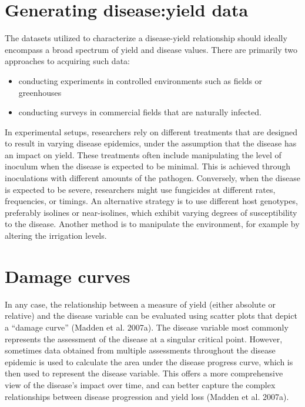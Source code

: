 \documentclass[
  letterpaper,
]{book}
\begin{document}
\hypertarget{generating-diseaseyield-data}{%
\section{Generating disease:yield
data}\label{generating-diseaseyield-data}}

The datasets utilized to characterize a disease-yield relationship
should ideally encompass a broad spectrum of yield and disease values.
There are primarily two approaches to acquiring such data:

\begin{itemize}
\item
  conducting experiments in controlled environments such as fields or
  greenhouses
\item
  conducting surveys in commercial fields that are naturally infected.
\end{itemize}

In experimental setups, researchers rely on different treatments that
are designed to result in varying disease epidemics, under the
assumption that the disease has an impact on yield. These treatments
often include manipulating the level of inoculum when the disease is
expected to be minimal. This is achieved through inoculations with
different amounts of the pathogen. Conversely, when the disease is
expected to be severe, researchers might use fungicides at different
rates, frequencies, or timings. An alternative strategy is to use
different host genotypes, preferably isolines or near-isolines, which
exhibit varying degrees of susceptibility to the disease. Another method
is to manipulate the environment, for example by altering the irrigation
levels.

\hypertarget{damage-curves}{%
\section{Damage curves}\label{damage-curves}}

In any case, the relationship between a measure of yield (either
absolute or relative) and the disease variable can be evaluated using
scatter plots that depict a ``damage curve'' (Madden et al. 2007a). The
disease variable most commonly represents the assessment of the disease
at a singular critical point. However, sometimes data obtained from
multiple assessments throughout the disease epidemic is used to
calculate the area under the disease progress curve, which is then used
to represent the disease variable. This offers a more comprehensive view
of the disease's impact over time, and can better capture the complex
relationships between disease progression and yield loss (Madden et al.
2007a).
\end{document}
